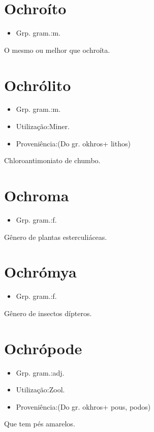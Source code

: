 \section{Ochroíto}
\begin{itemize}
\item {Grp. gram.:m.}
\end{itemize}
O mesmo ou melhor que \textunderscore ochroíta\textunderscore .
\section{Ochrólito}
\begin{itemize}
\item {Grp. gram.:m.}
\end{itemize}
\begin{itemize}
\item {Utilização:Miner.}
\end{itemize}
\begin{itemize}
\item {Proveniência:(Do gr. \textunderscore okhros\textunderscore  + \textunderscore lithos\textunderscore )}
\end{itemize}
Chloroantimoniato de chumbo.
\section{Ochroma}
\begin{itemize}
\item {Grp. gram.:f.}
\end{itemize}
Gênero de plantas esterculiáceas.
\section{Ochrómya}
\begin{itemize}
\item {Grp. gram.:f.}
\end{itemize}
Gênero de insectos dípteros.
\section{Ochrópode}
\begin{itemize}
\item {Grp. gram.:adj.}
\end{itemize}
\begin{itemize}
\item {Utilização:Zool.}
\end{itemize}
\begin{itemize}
\item {Proveniência:(Do gr. \textunderscore okhros\textunderscore  + \textunderscore pous\textunderscore , \textunderscore podos\textunderscore )}
\end{itemize}
Que tem pés amarelos.
